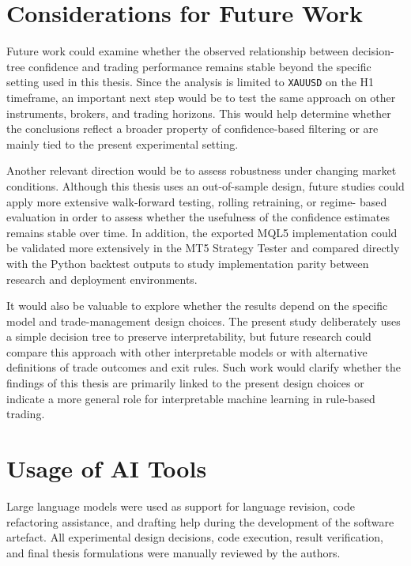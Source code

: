 \section{Considerations for Future Work}

Future work could examine whether the observed relationship between
decision-tree confidence and trading performance remains stable beyond the
specific setting used in this thesis. Since the analysis is limited to
\texttt{XAUUSD} on the H1 timeframe, an important next step would be to test
the same approach on other instruments, brokers, and trading horizons. This
would help determine whether the conclusions reflect a broader property of
confidence-based filtering or are mainly tied to the present experimental
setting.

Another relevant direction would be to assess robustness under changing market
conditions. Although this thesis uses an out-of-sample design, future studies
could apply more extensive walk-forward testing, rolling retraining, or regime-
based evaluation in order to assess whether the usefulness of the confidence
estimates remains stable over time. In addition, the exported MQL5
implementation could be validated more extensively in the MT5 Strategy Tester
and compared directly with the Python backtest outputs to study implementation
parity between research and deployment environments.

It would also be valuable to explore whether the results depend on the specific
model and trade-management design choices. The present study deliberately uses
a simple decision tree to preserve interpretability, but future research could
compare this approach with other interpretable models or with alternative
definitions of trade outcomes and exit rules. Such work would clarify whether
the findings of this thesis are primarily linked to the present design choices
or indicate a more general role for interpretable machine learning in
rule-based trading.

\section{Usage of AI Tools}

Large language models were used as support for language revision, code
refactoring assistance, and drafting help during the development of the
software artefact. All experimental design decisions, code execution, result
verification, and final thesis formulations were manually reviewed by the
authors.
